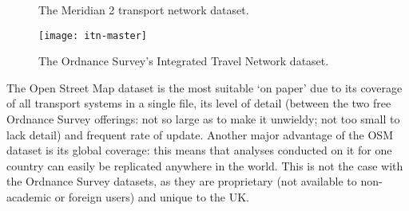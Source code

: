 \begin{figure}[h]
 \begin{center}
 \end{center}
 \caption{The Meridian 2 transport network dataset.}
 \label{fcam-merid2}
\end{figure}

\begin{figure}[h]
 \begin{center}
 \texttt{[image: itn-master]}\end{center}
 \caption{The Ordnance Survey's Integrated Travel Network dataset.}
 \label{fitn-master}
\end{figure}

The Open Street Map dataset is the most suitable `on paper' due to its coverage
of all transport systems in a single file, its level of detail (between the two
free Ordnance Survey offerings: not so large as to make it unwieldy; not too
small to lack detail) and frequent rate of update. Another major advantage of
the OSM dataset is its global coverage: this means that analyses conducted on
it for one country can easily be replicated anywhere in the world. This is not
the case with the Ordnance Survey datasets, as they are proprietary (not
available to non-academic or foreign users) and unique to the UK.

